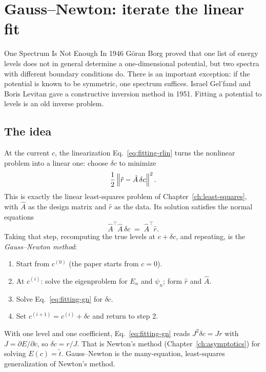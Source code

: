 \section{Gauss--Newton: iterate the linear fit}\label{sec:fitting-gn}
\begin{didyouknow}{One Spectrum Is Not Enough}
In 1946 G\"oran Borg proved that one list of energy levels does not in general determine a one-dimensional potential, but two spectra with different boundary conditions do. There is an important exception: if the potential is known to be symmetric, one spectrum suffices. Israel Gel'fand and Boris Levitan gave a constructive inversion method in 1951. Fitting a potential to levels is an old inverse problem.
\end{didyouknow}

\subsection{The idea}

At the current $c$, the linearization Eq.~\eqref{eq:fitting-rlin} turns the nonlinear problem into a linear one: choose $\delta c$ to minimize
\[
\frac12\left\lVert \hat r-\hat A\,\delta c\right\rVert^2 .
\]
This is exactly the linear least-squares problem of Chapter~\ref{ch:least-squares}, with $\hat A$ as the design matrix and $\hat r$ as the data. Its solution satisfies the normal equations
\begin{equation}
\hat A^\top\hat A\,\delta c \;=\; \hat A^\top\hat r .
\label{eq:fitting-gn}
\end{equation}
Taking that step, recomputing the true levels at $c+\delta c$, and repeating, is the \emph{Gauss--Newton method}:

\begin{enumerate}
\item Start from $c^{(0)}$ (the paper starts from $c=0$).
\item At $c^{(i)}$: solve the eigenproblem for $E_n$ and $\psi_n$; form $\hat r$ and $\hat A$.
\item Solve Eq.~\eqref{eq:fitting-gn} for $\delta c$.
\item Set $c^{(i+1)}=c^{(i)}+\delta c$ and return to step 2.
\end{enumerate}

With one level and one coefficient, Eq.~\eqref{eq:fitting-gn} reads $J^2\delta c=Jr$ with $J=\partial E/\partial c$, so $\delta c=r/J$. That is Newton's method (Chapter~\ref{ch:asymptotics}) for solving $E(c)=\tilde t$. Gauss--Newton is the many-equation, least-squares generalization of Newton's method.

